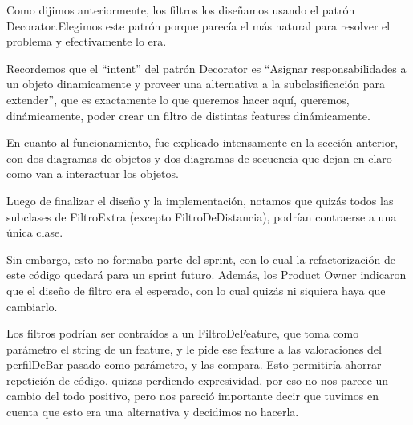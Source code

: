 Como dijimos anteriormente, los filtros los diseñamos usando el patrón Decorator.Elegimos este patrón porque parecía el más natural para resolver el problema y efectivamente lo era.

Recordemos que el ``intent'' del patrón Decorator es ``Asignar responsabilidades a un objeto dinamicamente y proveer una alternativa a la subclasificación para extender'', que es exactamente lo que queremos hacer aquí, queremos, dinámicamente, poder crear un filtro de distintas features dinámicamente.

En cuanto al funcionamiento, fue explicado intensamente en la sección anterior, con dos diagramas de objetos y dos diagramas de secuencia que dejan en claro como van a interactuar los objetos.

Luego de finalizar el diseño y la implementación, notamos que quizás todos las subclases de FiltroExtra (excepto FiltroDeDistancia), podrían contraerse a una única clase. 

Sin embargo, esto no formaba parte del sprint, con lo cual la refactorización de este código quedará para un sprint futuro. Además, los Product Owner indicaron que el diseño de filtro era el esperado, con lo cual quizás ni siquiera haya que cambiarlo.

Los filtros podrían ser contraídos a un FiltroDeFeature, que toma como parámetro el string de un feature, y le pide ese feature a las valoraciones del perfilDeBar pasado como parámetro, y las compara. Esto permitiría ahorrar repetición de código, quizas perdiendo expresividad, por eso no nos parece un cambio del todo positivo, pero nos pareció importante decir que tuvimos en cuenta que esto era una alternativa y decidimos no hacerla.


